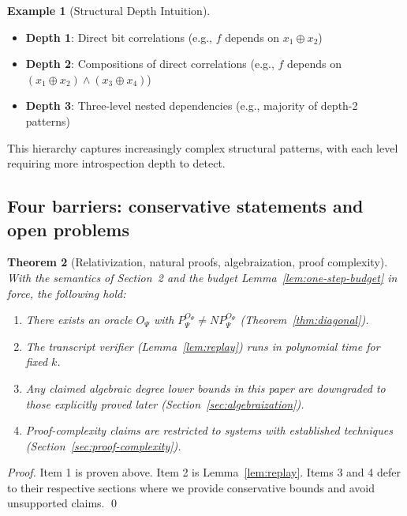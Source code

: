 \documentclass[11pt]{article}
\newtheorem{theorem}{Theorem}[section]
\theoremstyle{definition}
\newtheorem{example}[theorem]{Example}
\newcommand{\PSi}{\Psi}
\begin{document}
\begin{example}[Structural Depth Intuition]
\begin{itemize}
\item \textbf{Depth 1}: Direct bit correlations (e.g., $f$ depends on $x_1 \oplus x_2$)
\item \textbf{Depth 2}: Compositions of direct correlations (e.g., $f$ depends on $(x_1 \oplus x_2) \wedge (x_3 \oplus x_4)$)
\item \textbf{Depth 3}: Three-level nested dependencies (e.g., majority of depth-2 patterns)
\end{itemize}
This hierarchy captures increasingly complex structural patterns, with each level requiring more introspection depth to detect.
\end{example}


\subsection{Four barriers: conservative statements and open problems}

\begin{theorem}[Relativization, natural proofs, algebraization, proof complexity]
With the semantics of Section~2 and the budget Lemma~\ref{lem:one-step-budget} in force, the following hold:
\begin{enumerate}
  \item There exists an oracle $O_\PSi$ with $P^{O_\PSi}_\PSi \neq NP^{O_\PSi}_\PSi$ (Theorem~\ref{thm:diagonal}).
  \item The transcript verifier (Lemma~\ref{lem:replay}) runs in polynomial time for fixed $k$.
  \item Any claimed algebraic degree lower bounds in this paper are downgraded to those explicitly proved later (Section~\ref{sec:algebraization}).
  \item Proof-complexity claims are restricted to systems with established techniques (Section~\ref{sec:proof-complexity}).
\end{enumerate}
\end{theorem}
\begin{proof}
Item 1 is proven above. Item 2 is Lemma~\ref{lem:replay}. Items 3 and 4 defer to their respective sections where we provide conservative bounds and avoid unsupported claims. \qed
\end{proof}
\end{document}
